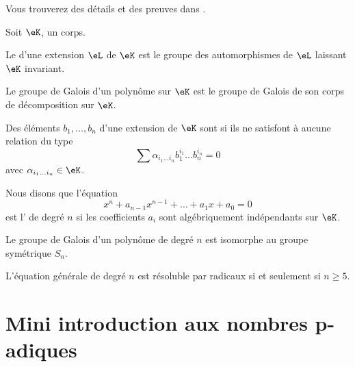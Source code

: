 Vous trouverez des détails et des preuves dans \cite{GalIEl}.

\begin{definition}
    Soit $\eK$, un corps.
    
    Le  d'une extension \( \eL\) de \( \eK\) est le groupe des automorphismes de \( \eL\) laissant \( \eK\) invariant. 

    Le groupe de Galois d'un polynôme sur \( \eK\) est le groupe de Galois de son corps de décomposition sur \( \eK\).
\end{definition}

\begin{definition}
    Des éléments \( b_1,\ldots, b_n\) d'une extension de \( \eK\) sont  si ils ne satisfont à aucune relation du type
    \begin{equation}
        \sum \alpha_{i_1\ldots i_n}b_1^{i_1}\ldots b_n^{i_n}=0
    \end{equation}
    avec \( \alpha_{i_1\ldots i_n}\in \eK\).
\end{definition}

Nous disons que l'équation
\begin{equation}
    x^n+a_{n-1}x^{n-1}+\ldots+a_1x+a_0=0
\end{equation}
est l' de degré \( n\) si les coefficients \( a_i\) sont algébriquement indépendants sur \( \eK\).

\begin{theorem}
    Le groupe de Galois d'un polynôme de degré \( n\) est isomorphe au groupe symétrique \( S_n\).
\end{theorem}

\begin{corollary}
    L'équation générale de degré \( n\) est résoluble par radicaux si et seulement si \( n\geq 5\).
\end{corollary}

\section{Mini introduction aux nombres \texorpdfstring{p}{$p$}-adiques}


